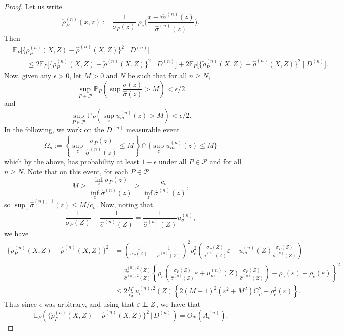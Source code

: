 \documentclass[aos]{imsart}
\newcommand{\pr}{\mathbb{P}}
\newcommand{\E}{\mathbb{E}}
\newcommand{\given}{\,|\,}
\newcommand{\independent}{\mbox{${}\perp\mkern-11mu\perp{}$}}
\begin{document}
\begin{proof}
		Let us write
		\[
		\check{\rho}_P^{(n)} (x, z) := \frac{1}{\sigma_P(z)}\; \rho_{e}\bigg(\frac{x-\hat m^{(n)}(z)}{\hat{\sigma}^{(n)}(z)}\bigg).
		\]
		Then
		\begin{align*}
			& \E_P\Big[\big\{\bar \rho ^{(n)}_P(X,Z)-\hat\rho^{(n)}(X,Z)\big\}^2 \;\Big|\; D^{(n)}\Big] \\
			& \qquad \leq 2\E_P\Big[\big\{\bar \rho ^{(n)}_P(X,Z)-\check\rho^{(n)}(X,Z)\big\}^2 \;\Big|\; D^{(n)}\Big] + 2\E_P\Big[\big\{\check \rho ^{(n)}_P(X,Z)-\hat\rho^{(n)}(X,Z)\big\}^2 \;\Big|\; D^{(n)}\Big].
		\end{align*}
		Now, given any $\epsilon > 0$, let $M>0$ and $N$ be such that for all $n \geq N$,
		\[
		\sup_{P \in \mathcal{P}} \pr_P\left(\sup_z \frac{\sigma(z)}{\hat{\sigma}(z)} > M \right) < \epsilon/2
		\]
		and
		\[
		\sup_{P \in \mathcal{P}} \pr_P(\sup_{z} u_m^{(n)}(z) >M ) < \epsilon/2.
		\]
		In the following, we work on the $D^{(n)}$ measurable event
		\[
		\Omega_n := \left\{ \sup_z \frac{\sigma_P(z)}{\hat{\sigma}^{(n)}(z)} \leq  M \right\} \cap \{\sup_{z}u_m^{(n)}(z) \leq M\}
		\]
		which by the above, has probability at least $1-\epsilon$ under all $P \in \mathcal{P}$ and for all $n \geq N$.
		Note that on this event, for each $P \in \mathcal{P}$
		\[
		M \geq \frac{\inf_{z} \sigma_P(z)}{ \inf_{z} \hat{\sigma}^{(n)}(z)} \geq \frac{c_\sigma}{\inf_{z} \hat{\sigma}^{(n)}(z)}, 
		\]
		so $\sup_z \hat{\sigma}^{(n),-1} (z) \leq M / c_{\sigma}$. 
		Now, noting that
		\[
		\frac{1}{\sigma_P(Z)} - \frac{1}{\hat{\sigma}^{(n)}(Z)} = \frac{1}{\hat{\sigma}^{(n)}(Z)}u_{\sigma}^{(n)},
		\]
		we have
		\begin{align*}
			\{\check{\rho}_P^{(n)}(X,Z) - \hat{\rho}^{(n)}(X, Z)\}^2 
            &=\left(\frac{1}{\sigma_P(Z)} - \frac{1}{\hat{\sigma}^{(n)}(Z)}\right)^2 \rho_{e}^2\left( \frac{\sigma_P(Z)}{\hat{\sigma}^{(n)}(Z)} \varepsilon - u_m^{(n)}(Z) \frac{\sigma_P(Z)}{\hat{\sigma}^{(n)}(Z)} \right)   \\
			& = \frac{u_{\sigma}^{(n),2}(Z)}{\hat{\sigma}^{(n),2}(Z)} \left\{ \rho_{e}\left( \frac{\sigma_P(Z)}{\hat{\sigma}^{(n)}(Z)} \varepsilon + u_m^{(n)}(Z) \frac{\sigma_P(Z)}{\hat{\sigma}^{(n)}(Z)} \right) - \rho_{e}(\varepsilon) + \rho_{e}(\varepsilon) \right\}^2 \\
				&\leq 2\frac{M^2}{c_{\sigma}^2} u_{\sigma}^{(n),2}(Z)\left\{2(M + 1)^2(\varepsilon^2 + M^2)C_\rho^2 + \rho_{e}^2 (\varepsilon)\right\}.
		\end{align*}
		Thus since $\epsilon$ was arbitrary, and using that $\varepsilon \independent Z$, we have that
		\[
		\E_P \left( 	\{\check{\rho}_P^{(n)}(X,Z) - \hat{\rho}^{(n)}(X, Z)\}^2 \given D^{(n)}\right) = O_{\mathcal{P}}(A_{\sigma}^{(n)}).
		\]
		

\end{proof}
\end{document}
